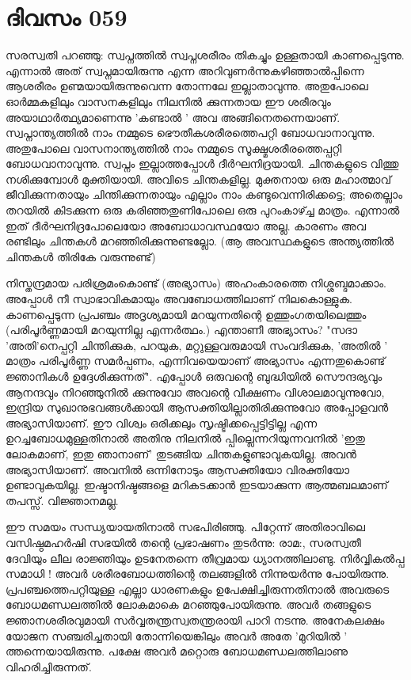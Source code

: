  
\section{ദിവസം 059}


സരസ്വതി പറഞ്ഞു: സ്വപ്നത്തില്‍ സ്വപ്നശരീരം തികച്ചും ഉള്ളതായി കാണപ്പെടുന്നു. എന്നാല്‍ അത്‌ സ്വപ്നമായിരുന്നു എന്ന അറിവുണര്‍ന്നുകഴിഞ്ഞാല്‍പ്പിന്നെ ആശരീരം ഉണ്മയായിരുന്നുവെന്ന തോന്നലേ ഇല്ലാതാവുന്നു. അതുപോലെ ഓര്‍മ്മകളിലും വാസനകളിലും നിലനില്‍ ക്കുന്നതായ ഈ ശരീരവും അയാഥാര്‍ത്ഥ്യമാണെന്നു 'കണ്ടാല്‍ ' അവ അങ്ങിനെതന്നെയാണ്‌. സ്വപ്നാന്ത്യത്തില്‍ നാം നമ്മുടെ ഭൌതീകശരീരത്തെപറ്റി ബോധവാനാവുന്നു. അതുപോലെ വാസനാന്ത്യത്തില്‍ നാം നമ്മുടെ സൂക്ഷ്മശരീരത്തെപ്പറ്റി ബോധവാനാവുന്നു. സ്വപ്നം ഇല്ലാത്തപ്പോള്‍ ദീര്‍ഘനിദ്രയായി. ചിന്തകളുടെ വിത്തു നശിക്കുമ്പോള്‍ മുക്തിയായി. അവിടെ ചിന്തകളില്ല. മുക്തനായ ഒരു മഹാത്മാവ്‌ ജീവിക്കുന്നതായും ചിന്തിക്കുന്നതായും എല്ലാം നാം കണ്ടുവെന്നിരിക്കട്ടെ; അതെല്ലാം തറയില്‍ കിടക്കുന്ന ഒരു കരിഞ്ഞതുണിപോലെ ഒരു പുറംകാഴ്ച്ച മാത്രം. എന്നാല്‍ ഇത്‌ ദീര്‍ഘനിദ്രപോലെയോ അബോധാവസ്ഥയോ അല്ല. കാരണം അവ രണ്ടിലും ചിന്തകള്‍ മറഞ്ഞിരിക്കുന്നുണ്ടല്ലോ. (ആ അവസ്ഥകളുടെ അന്ത്യത്തില്‍ ചിന്തകള്‍ തിരികേ വരുന്നുണ്ട്) 

നിസ്തന്ദ്രമായ പരിശ്രമംകൊണ്ട്‌ (അഭ്യാസം) അഹംകാരത്തെ നിശ്ശബ്ദമാക്കാം. അപ്പോൾ നീ സ്വാഭാവികമായും അവബോധത്തിലാണ്‌ നിലകൊള്ളുക. കാണപ്പെടുന്ന പ്രപഞ്ചം അദൃശ്യമായി മറയുന്നതിന്റെ ഉത്തുംഗതയിലെത്തും (പരിപൂര്‍ണ്ണമായി മറയുന്നില്ല എന്നര്‍ത്ഥം.) എന്താണീ അഭ്യാസം? "സദാ 'അതി'നെപ്പറ്റി ചിന്തിക്കുക, പറയുക, മറ്റുള്ളവരുമായി സംവദിക്കുക, 'അതില്‍ ' മാത്രം പരിപൂര്‍ണ്ണ സമര്‍പ്പണം, എന്നിവയെയാണ്‌ അഭ്യാസം എന്നതുകൊണ്ട്‌ ജ്ഞാനികള്‍ ഉദ്ദേശിക്കുന്നത്‌". എപ്പോള്‍ ഒരുവന്റെ ബുദ്ധിയില്‍ സൌന്ദര്യവും ആനന്ദവും നിറഞ്ഞുനില്‍ ക്കുന്നുവോ അവന്റെ വീക്ഷണം വിശാലമാവുന്നുവോ, ഇന്ദ്രിയ സുഖാനുഭവങ്ങള്‍ക്കായി ആസക്തിയില്ലാതിരിക്കുന്നുവോ അപ്പോളവന്‍ അഭ്യാസിയാണ്‌. ഈ വിശ്വം ഒരിക്കലും സൃഷ്ടിക്കപ്പെട്ടിട്ടില്ല എന്ന ഉറച്ചബോധമുള്ളതിനാല്‍ അതിനു നിലനില്‍ പ്പില്ലെന്നറിയുന്നവനില്‍ 'ഇതു ലോകമാണ്‌, ഇതു ഞാനാണ്‌' തുടങ്ങിയ ചിന്തകളുണ്ടാവുകയില്ല. അവന്‍ അഭ്യാസിയാണ്‌. അവനില്‍ ഒന്നിനോടും ആസക്തിയോ വിരക്തിയോ ഉണ്ടാവുകയില്ല. ഇഷ്ടാനിഷ്ടങ്ങളെ മറികടക്കാന്‍ ഇടയാക്കുന്ന ആത്മബലമാണ്‌ തപസ്സ്‌. വിജ്ഞാനമല്ല.

ഈ സമയം സന്ധ്യയായതിനാല്‍ സഭപിരിഞ്ഞു. പിറ്റേന്ന് അതിരാവിലെ വസിഷ്ഠമഹര്‍ഷി സഭയില്‍ തന്റെ പ്രഭാഷണം തുടര്‍ന്നു: രാമ:, സരസ്വതീ ദേവിയും ലീല രാജ്ഞിയും ഉടനേതന്നെ തീവ്രമായ ധ്യാനത്തിലാണ്ടു. നിര്‍വ്വികല്‍പ്പ സമാധി ! അവര്‍ ശരീരബോധത്തിന്റെ തലങ്ങളില്‍ നിന്നുയര്‍ന്നു പോയിരുന്നു. പ്രപഞ്ചത്തെപറ്റിയുള്ള എല്ലാ ധാരണകളും ഉപേക്ഷിച്ചിരുന്നതിനാല്‍ അവരുടെ ബോധമണ്ഡലത്തില്‍ ലോകമാകെ മറഞ്ഞുപോയിരുന്നു. അവര്‍ തങ്ങളുടെ ജ്ഞാനശരീരവുമായി സര്‍വ്വതന്ത്രസ്വതന്ത്രരായി പാറി നടന്നു. അനേകലക്ഷം യോജന സഞ്ചരിച്ചതായി തോന്നിയെങ്കിലും അവര്‍ അതേ 'മുറിയില്‍ ' ത്തന്നെയായിരുന്നു. പക്ഷേ അവര്‍ മറ്റൊരു ബോധമണ്ഡലത്തിലാണു വിഹരിച്ചിരുന്നത്‌.
